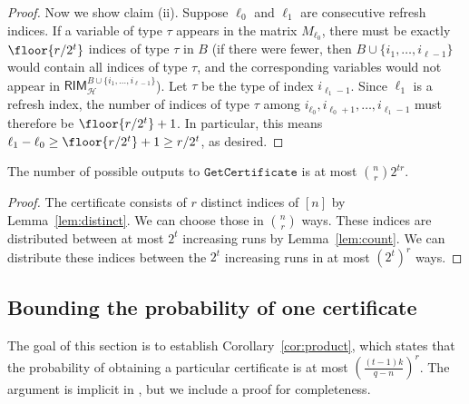 \documentclass{article}[11pt]
\begin{document}
\begin{proof}
  Now we show claim (ii). Suppose $\ell_0$ and $\ell_1$ are consecutive refresh indices. If a variable of type $\tau$ appears in the matrix $M_{\ell_0}$, there must be exactly $\floor{r/2^t}$ indices of type $\tau$ in $B$ (if there were fewer, then $B\cup\{i_1,\dots,i_{\ell-1}\}$ would contain all indices of type $\tau$, and the corresponding variables would not appear in $\mathsf{RIM}_{\mathcal{H}}^{B\cup\{i_1,\dots,i_{\ell-1}\}}$).
    Let $\tau$ be the type of index $i_{\ell_1-1}$.
    Since $\ell_1$ is a refresh index, the number of indices of type $\tau$ among $i_{\ell_0},i_{\ell_0+1},\dots,i_{\ell_1-1}$ must therefore be $\floor{r/2^t}+1$.
    In particular, this means $\ell_1 - \ell_0 \ge \floor{r/2^t} + 1 \ge r/2^t$, as desired.
\end{proof}
\begin{corollary}
  The number of possible outputs to $\mathtt{GetCertificate}$ is at most $\binom{n}{r}2^{tr}$.
  \label{cor:count}
\end{corollary}
\begin{proof}
  The certificate consists of $r$ distinct indices of $[n]$ by Lemma~\ref{lem:distinct}. We can choose those in $\binom{n}{r}$ ways. These indices are distributed between at most $2^t$ increasing runs by Lemma~\ref{lem:count}. We can distribute these indices between the $2^t$ increasing runs in at most $(2^t)^r$ ways. 
\end{proof}


\subsection{Bounding the probability of one certificate}

The goal of this section is to establish Corollary~\ref{cor:product}, which states that the probability of obtaining a particular certificate is at most $(\frac{(t-1)k}{q-n})^r$.
The argument is implicit in \cite{GZ23}, but we include a proof for completeness.
\end{document}
